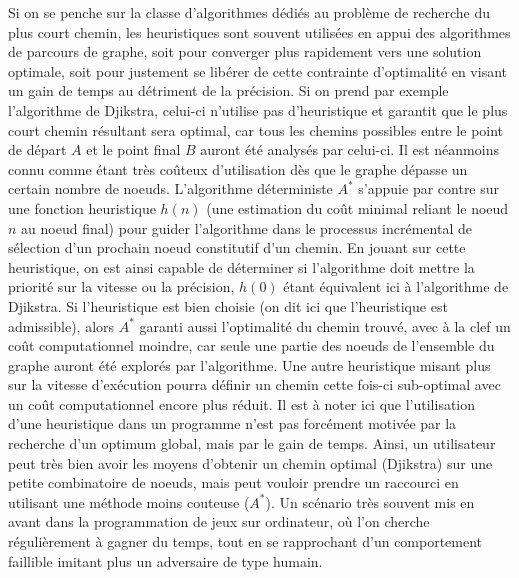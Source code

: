 Si on se penche sur la classe d'algorithmes dédiés au problème de recherche du plus court chemin, les heuristiques sont souvent utilisées en appui des algorithmes de parcours de graphe, soit pour converger plus rapidement vers une solution optimale, soit pour justement se libérer de cette contrainte d'optimalité en visant un gain de temps au détriment de la précision. Si on prend par exemple l'algorithme de Djikstra, celui-ci n'utilise pas d'heuristique et garantit que le plus court chemin résultant sera optimal, car tous les chemins possibles entre le point de départ $A$ et le point final $B$ auront été analysés par celui-ci. Il est néanmoins connu comme étant très coûteux d'utilisation dès que le graphe dépasse un certain nombre de noeuds. L'algorithme déterministe $A^*$ s'appuie par contre sur une fonction heuristique $h(n)$ (une estimation du coût minimal reliant le noeud $n$ au noeud final) pour guider l'algorithme dans le processus incrémental de sélection d'un prochain noeud constitutif d'un chemin. En jouant sur cette heuristique, on est ainsi capable de déterminer si l'algorithme doit mettre la priorité sur la vitesse ou la précision, $h(0)$ étant équivalent ici à l'algorithme de Djikstra. Si l'heuristique est bien choisie (on dit ici que l'heuristique est admissible), alors $A^*$ garanti aussi l'optimalité du chemin trouvé, avec à la clef un coût computationnel moindre, car seule une partie des noeuds de l'ensemble du graphe auront été explorés par l'algorithme. Une autre heuristique misant plus sur la vitesse d'exécution pourra définir un chemin cette fois-ci sub-optimal avec un coût computationnel encore plus réduit. Il est à noter ici que l'utilisation d'une heuristique dans un programme n'est pas forcément motivée par la recherche d'un optimum global, mais par le gain de temps. Ainsi, un utilisateur peut très bien avoir les moyens d'obtenir un chemin optimal (Djikstra) sur une petite combinatoire de noeuds, mais peut vouloir prendre un raccourci en utilisant une méthode moins couteuse ($A^*$). Un scénario très souvent mis en avant dans la programmation de jeux sur ordinateur, où l'on cherche régulièrement à gagner du temps, tout en se rapprochant d'un comportement faillible imitant plus un adversaire de type humain.

